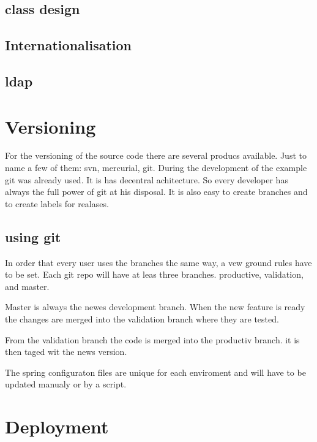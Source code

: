 \documentclass[paper=a4,twoside=false,BCOR=0mm,DIV=calc,fontsize=12pt]{scrartcl}
\begin{document}
\subsection{class design}






\subsection{Internationalisation}




\subsection{ldap}




\section{Versioning}
For the versioning of the source code there are several producs available. Just to name a few of them: svn, mercurial, git.
During the development of the example git was already used. It is has decentral achitecture. So every developer has always the full power of git at his disposal. It is also easy to create branches and to create labels for realases.

\subsection{using git}
In order that every user uses the branches the same way, a vew ground rules have to be set.
Each git repo will have at leas three branches. productive, validation, and master.

Master is always the newes development branch. When the new feature is ready the changes are merged into the validation branch where they are tested. 



From the validation branch the code is merged into the productiv branch. it is then taged wit the news version.

The spring configuraton files are unique for each enviroment and will have to be updated manualy or by a script.


\section{Deployment}
\end{document}
